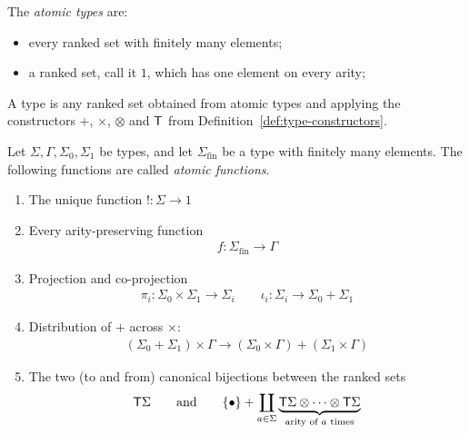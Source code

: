 

\begin{definition}[Types] The \emph{atomic types} are:
    \begin{itemize}
        \item every ranked set with finitely many elements;
        \item a ranked set, call it  $1$, which has one element on every arity;
    \end{itemize}
    A type is any ranked set obtained from atomic types and applying the constructors $+$, $\times$, $\otimes$ and $\mathsf T$ from Definition~\ref{def:type-constructors}.
\end{definition}
    




\begin{definition}\label{def:atomic-functions}
    Let $\Sigma,\Gamma,\Sigma_0,\Sigma_1$ be types, and let $\Sigma_{\text{fin}}$ be a type with finitely many elements. The following functions are called \emph{atomic functions}. 
\begin{enumerate}
    \item The unique  function $! : \Sigma \to 1$
    \item Every arity-preserving function
    \begin{align*}
        f : \Sigma_{\text{fin}} \to \Gamma
    \end{align*}
    \item Projection and co-projection
    \begin{align*}
        \pi_i : \Sigma_0 \times \Sigma_1 \to \Sigma_i \qquad \iota_i : \Sigma_i \to \Sigma_0 + \Sigma_1
    \end{align*}
    \item Distribution of $+$ across $\times$:
\begin{align*}
    (\Sigma_0 + \Sigma_1 ) \times \Gamma \to (\Sigma_0 \times \Gamma) + (\Sigma_1 \times \Gamma)
\end{align*}
\item The two (to and from) canonical bijections between the ranked sets
 \begin{align*}
    \mathsf T \Sigma \qquad \text{and} \qquad    \{\bullet\} + \coprod_{a \in \Sigma} \underbrace{\mathsf T \Sigma \otimes \cdots \otimes \mathsf T \Sigma}_{\text{arity of $a$ times}}
\end{align*}



\end{enumerate}
\end{definition}
